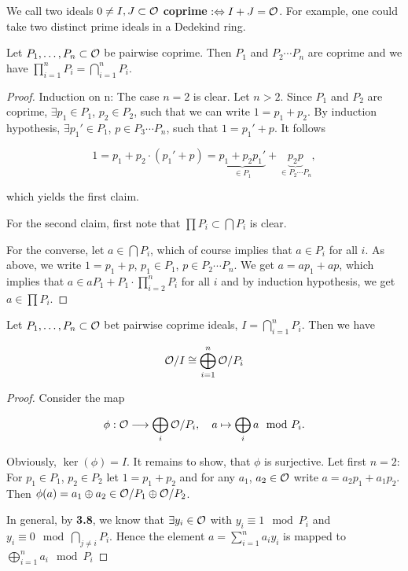 
\begin{defi}
	We call two ideals $0 \neq I, J \subset \mathcal{O}$ \textbf{coprime} $:\Leftrightarrow I + J = \mathcal{O}$. For example, one could take two distinct prime ideals in a Dedekind ring.
\end{defi}

\begin{Bem}
	Let $P_1, \dots, P_n \subset \mathcal{O}$ be pairwise coprime.
	Then $P_1$ and $P_2 \cdots P_n$ are coprime and we have $\prod_{i=1}^n P_i = \bigcap_{i=1}^n P_i.$
\end{Bem}
\begin{proof}
	Induction on n: The case $n = 2$ is clear.	
	Let $n > 2$.
	Since $P_1$ and $P_2$ are coprime, $\exists p_1 \in P_1$, $p_2 \in P_2$, such that we can write $1 = p_1 + p_2$.
	By induction hypothesis, $\exists p_1' \in P_1$, $p \in P_3 \cdots P_n$, such that $1 = p_1' + p$.
	 It follows
		
	\[ 1 = p_1 + p_2 \cdot (p_1'+p)	= \underbrace{p_1+p_2p_1'}_{\in P_1} + \underbrace{p_2p}_{\in P_2 \cdots P_n}, \]
		
	which yields the first claim.
	
	\bigskip
	
	For the second claim, first note that $\prod P_i \subset \bigcap P_i$ is clear.
	
	For the converse, let $a \in \bigcap P_i$, which of course implies that $a \in P_i$ for all $i$.
	As above, we write $1 = p_1 + p$,  $p_1 \in P_1$, $p \in P_2 \cdots P_n$.
	We get  $a = ap_1 + ap$, which implies that $a \in aP_1+P_1 \cdot \prod_{i=2}^n P_i$ for all $i$ and by induction hypothesis, we get $a \in \prod P_i$.
\end{proof}
	
\begin{Satz}
	Let $P_1, \dots, P_n \subset \mathcal{O}$ bet pairwise coprime ideals, $I = \bigcap_{i=1}^n P_i$.
	Then we have
	
	\[ \mathcal{O} / I \cong \bigoplus_{i=1}^n \mathcal{O} / P_i	\] 
\end{Satz}
\begin{proof}
	Consider the map 
		
	\[ \phi: \mathcal{O} \longrightarrow \bigoplus_i \mathcal{O} /P_i, \quad  a \mapsto \bigoplus_i a \mod P_i. \] 
		
	Obviously, $\ker(\phi) = I$.
	It remains to show, that $\phi$ is surjective.
	Let first $n = 2$:	
	For $p_1 \in P_1$, $p_2 \in P_2$ let $1 = p_1 + p_2$ and for any $a_1$, $a_2 \in \mathcal{O}$ write $a = a_2p_1 + a_1p_2$. Then $\phi(a) = a_1 \oplus a_2 \in \mathcal{O} / P_1 \oplus \mathcal{O} / P_2$.
	
	\bigskip
	
	In general, by \textbf{3.8}, we know that $\exists y_i \in \mathcal{O}$ with $y_i \equiv 1 \mod P_i$ and $y_i \equiv 0 \mod \bigcap_{j \neq i}P_i$. Hence the element $a = \sum_{i = 1}^n a_iy_i$ is mapped to $\bigoplus_{i=1}^n a_i \mod P_i$	
\end{proof}

